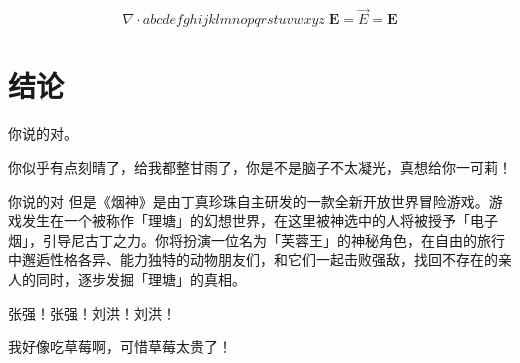 \[
    \nabla \cdot abcdefghijklmnopqrstuvwxyz \; \mathbf{E}=\vec{E}=\boldsymbol{E}
\]




\chapter*{结\quad 论}

你说的对。

你似乎有点刻晴了，给我都整甘雨了，你是不是脑子不太凝光，真想给你一可莉！

你说的对 但是《烟神》是由丁真珍珠自主研发的一款全新开放世界冒险游戏。游戏发生在一个被称作「理塘」的幻想世界，在这里被神选中的人将被授予「电子烟」，引导尼古丁之力。你将扮演一位名为「芙蓉王」的神秘角色，在自由的旅行中邂逅性格各异、能力独特的动物朋友们，和它们一起击败强敌，找回不存在的亲人的同时，逐步发掘「理塘」的真相。

张强！张强！刘洪！刘洪！

我好像吃草莓啊，可惜草莓太贵了！


